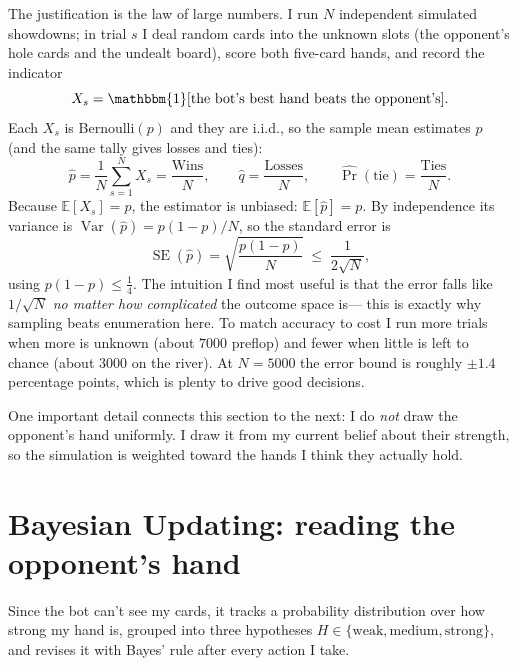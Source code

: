 \documentclass[11pt]{article}
\DeclareMathOperator{\Var}{Var}
\newcommand{\SE}{\operatorname{SE}}
\newcommand{\ind}{\mathbbm{1}}
\begin{document}
The justification is the law of large numbers. I run $N$ independent simulated
showdowns; in trial $s$ I deal random cards into the unknown slots (the
opponent's hole cards and the undealt board), score both five-card hands, and
record the indicator
\begin{equation}
X_s=\ind[\text{the bot's best hand beats the opponent's}].
\end{equation}
Each $X_s$ is Bernoulli$(p)$ and they are i.i.d., so the sample mean estimates
$p$ (and the same tally gives losses and ties):
\begin{equation}
\hat p=\frac1N\sum_{s=1}^N X_s=\frac{\text{Wins}}{N},\qquad
\hat q=\frac{\text{Losses}}{N},\qquad
\widehat{\Pr}(\text{tie})=\frac{\text{Ties}}{N}.
\end{equation}
Because $\mathbb{E}[X_s]=p$, the estimator is unbiased: $\mathbb{E}[\hat p]=p$.
By independence its variance is $\Var(\hat p)=p(1-p)/N$, so the standard error is
\begin{equation}
\SE(\hat p)=\sqrt{\frac{p(1-p)}{N}}\;\le\;\frac{1}{2\sqrt N},
\end{equation}
using $p(1-p)\le\tfrac14$. The intuition I find most useful is that the error
falls like $1/\sqrt N$ \emph{no matter how complicated} the outcome space is---
this is exactly why sampling beats enumeration here. To match accuracy to cost I
run more trials when more is unknown (about $7000$ preflop) and fewer when
little is left to chance (about $3000$ on the river). At $N=5000$ the error bound
is roughly $\pm1.4$ percentage points, which is plenty to drive good decisions.

One important detail connects this section to the next: I do \emph{not} draw the
opponent's hand uniformly. I draw it from my current belief about their strength,
so the simulation is weighted toward the hands I think they actually hold.

\section{Bayesian Updating: reading the opponent's hand}\label{sec:bayes}

Since the bot can't see my cards, it tracks a probability distribution over how
strong my hand is, grouped into three hypotheses
$H\in\{\text{weak},\text{medium},\text{strong}\}$, and revises it with Bayes'
rule after every action I take.
\end{document}
